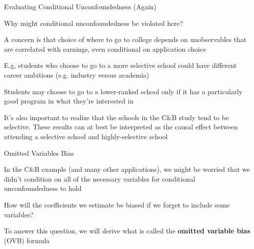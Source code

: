 \documentclass[11pt,english,handout]{beamer}
\newenvironment{wideitemize}{\itemize\addtolength{\itemsep}{10pt}}{\enditemize}
\begin{document}
\begin{frame}{Evaluating Conditional Unconfoundedness (Again)}

\begin{wideitemize}
	\item
	Why might conditional unconfoundedness be violated here? 
	
	\pause
	\item
	A concern is that choice of where to go to college depends on unobservables that are correlated with earnings, even conditional on application choice\smallskip

		\begin{wideitemize}
			\item
			E.g, students who choose to go to a more selective school could have different career ambitions (e.g. industry versus academia)
			
			\pause
			\item
			Students may choose to go to a lower-ranked school only if it has a particularly good program in what they're interested in
			
	 \end{wideitemize}
 
 	\pause
 	\item
 	It's also important to realize that the schools in the C\&B study tend to be selective. These results can at best be interpreted as the causal effect between attending a selective school and highly-selective school
\end{wideitemize}
	
\end{frame}




\begin{frame}{Omitted Variables Bias}
	\begin{wideitemize}
		\item
		In the C\&B example (and many other applications), we might be worried that we didn't condition on all of the necessary variables for conditional unconfoundedness to hold
		
		\pause
		\item
		How will the coefficients we estimate be biased if we forget to include some variables? 
		
		\pause
		\item
		To answer this question, we will derive what is called the \textbf{omitted variable bias} (OVB) formula
	\end{wideitemize}
\end{frame}
\end{document}
